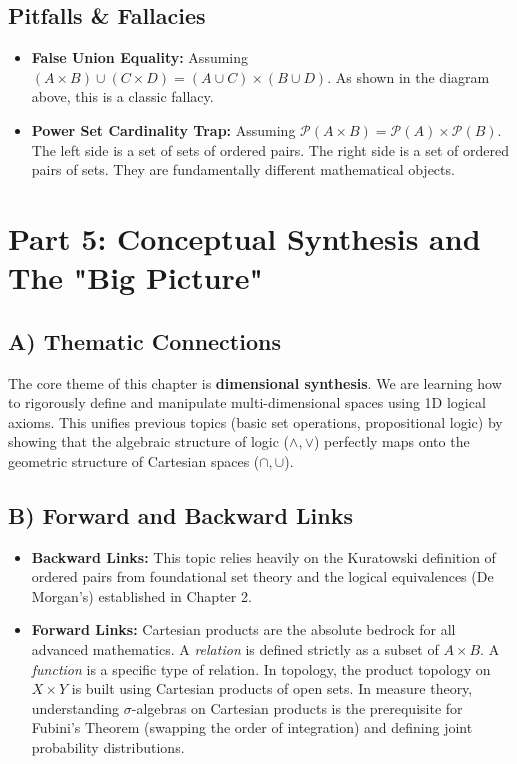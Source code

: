 \documentclass[11pt]{article}
\newcommand{\powerset}{\mathcal{P}}
\begin{document}
\subsection{Pitfalls \& Fallacies}
\begin{itemize}
    \item \textbf{False Union Equality:} Assuming $(A \times B) \cup (C \times D) = (A \cup C) \times (B \cup D)$. As shown in the diagram above, this is a classic fallacy.
    \item \textbf{Power Set Cardinality Trap:} Assuming $\powerset(A \times B) = \powerset(A) \times \powerset(B)$. The left side is a set of sets of ordered pairs. The right side is a set of ordered pairs of sets. They are fundamentally different mathematical objects.
\end{itemize}

\section{Part 5: Conceptual Synthesis and The "Big Picture"}

\subsection{A) Thematic Connections}
The core theme of this chapter is \textbf{dimensional synthesis}. We are learning how to rigorously define and manipulate multi-dimensional spaces using 1D logical axioms. This unifies previous topics (basic set operations, propositional logic) by showing that the algebraic structure of logic ($\land, \lor$) perfectly maps onto the geometric structure of Cartesian spaces ($\cap, \cup$).

\subsection{B) Forward and Backward Links}
\begin{itemize}
    \item \textbf{Backward Links:} This topic relies heavily on the Kuratowski definition of ordered pairs from foundational set theory and the logical equivalences (De Morgan's) established in Chapter 2.
    \item \textbf{Forward Links:} Cartesian products are the absolute bedrock for all advanced mathematics. A \textit{relation} is defined strictly as a subset of $A \times B$. A \textit{function} is a specific type of relation. In topology, the product topology on $X \times Y$ is built using Cartesian products of open sets. In measure theory, understanding $\sigma$-algebras on Cartesian products is the prerequisite for Fubini's Theorem (swapping the order of integration) and defining joint probability distributions.
\end{itemize}
\end{document}

